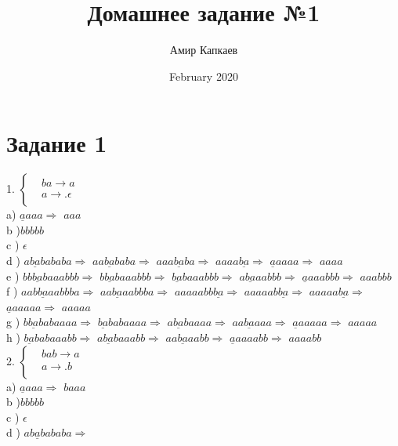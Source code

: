 \documentclass{article}
\title{Домашнее задание №1}
\author{Амир Капкаев}
\date{February 2020}
\begin{document}
\maketitle
\newpage


\section{Задание 1}

1. $ \left\{
\begin{aligned}
&ba \rightarrow a \\
&a \rightarrow .\epsilon \\
\end{aligned}
\right.$ 
\\
a) $\underline{a}aaa \Rightarrow$
$aaa$
\\
b )$bbbbb$ 
\\
c ) $\epsilon$
\\
d ) $a\underline{ba}bababa \Rightarrow$
$aa\underline{ba}baba\Rightarrow$
$aaa\underline{ba}ba\Rightarrow$
$aaaa\underline{ba}\Rightarrow$
$\underline{a}aaaa\Rightarrow$
$aaaa$
\\
e ) $bb\underline{ba}baaabbb \Rightarrow$
$b\underline{ba}baaabbb \Rightarrow$
$\underline{ba}baaabbb \Rightarrow$
$a\underline{ba}aabbb \Rightarrow$
$\underline{a}aaabbb \Rightarrow$
$ aaabbb$
\\
f ) $aab\underline{ba}aabbba \Rightarrow$
$aa\underline{ba}aabbba \Rightarrow$
$aaaaabb\underline{ba} \Rightarrow$
$aaaaab\underline{ba} \Rightarrow$
$aaaaa\underline{ba} \Rightarrow$
$\underline{a}aaaaa \Rightarrow$
$aaaaa$
\\
g ) $b\underline{ba}babaaaa \Rightarrow$
$\underline{ba}babaaaa \Rightarrow$
$a\underline{ba}baaaa \Rightarrow$
$aa\underline{ba}aaa \Rightarrow$
$\underline{a}aaaaa \Rightarrow$
$aaaaa$
\\
h ) $\underline{ba}babaaabb \Rightarrow$
$a\underline{ba}baaabb \Rightarrow$
$aa\underline{ba}aabb \Rightarrow$
$\underline{a}aaaabb \Rightarrow$
$aaaabb$
\\
2. $ \left\{
\begin{aligned}
&bab \rightarrow a \\
&a \rightarrow .b \\
\end{aligned}
\right.$ 
\\
a) $\underline{a}aaa \Rightarrow$
$baaa$
\\
b )$bbbbb$ 
\\
c ) $\epsilon$
\\
d ) $a\underline{bab}ababa \Rightarrow$
\end{document}

